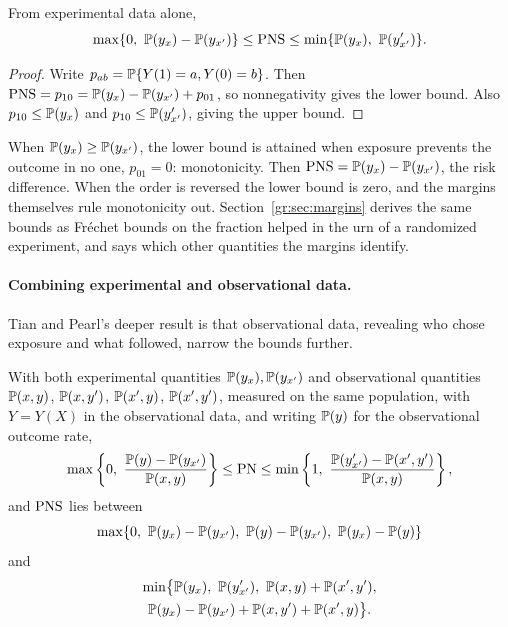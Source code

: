 \begin{theorem}
From experimental data alone,
\[
\max\{0,\ \Prob(y_x) - \Prob(y_{x'})\} \leq \PNS \leq \min\{\Prob(y_x),\ \Prob(y'_{x'})\}.
\]
\end{theorem}

\begin{proof}
Write $p_{ab} = \mathbb{P}\{Y(1) = a, Y(0) = b\}$. Then $\mathrm{PNS} = p_{10} = \mathbb{P}(y_x) - \mathbb{P}(y_{x'}) + p_{01}$, so nonnegativity gives the lower bound. Also $p_{10} \leq \mathbb{P}(y_x)$ and $p_{10} \leq \mathbb{P}(y'_{x'})$, giving the upper bound.
\end{proof}

When $\mathbb{P}(y_x) \geq \mathbb{P}(y_{x'})$, the lower bound is attained when exposure prevents the outcome in no one, $p_{01} = 0$: monotonicity. Then $\mathrm{PNS} = \mathbb{P}(y_x) - \mathbb{P}(y_{x'})$, the risk difference. When the order is reversed the lower bound is zero, and the margins themselves rule monotonicity out. Section~\ref{gr:sec:margins} derives the same bounds as Fr\'echet bounds on the fraction helped in the urn of a randomized experiment, and says which other quantities the margins identify.

\paragraph{Combining experimental and observational data.} Tian and Pearl's deeper result is that observational data, revealing who chose exposure and what followed, narrow the bounds further.

\begin{theorem}
With both experimental quantities $\mathbb{P}(y_x), \mathbb{P}(y_{x'})$ and observational quantities $\mathbb{P}(x, y)$, $\mathbb{P}(x, y')$, $\mathbb{P}(x', y)$, $\mathbb{P}(x', y')$, measured on the same population, with $Y = Y(X)$ in the observational data, and writing $\mathbb{P}(y)$ for the observational outcome rate,
\[
\max\left\{0,\ \frac{\Prob(y) - \Prob(y_{x'})}{\Prob(x, y)}\right\} \leq \PN \leq \min\left\{1,\ \frac{\Prob(y'_{x'}) - \Prob(x', y')}{\Prob(x, y)}\right\},
\]
and $\mathrm{PNS}$ lies between
\[
\max\{0,\ \mathbb{P}(y_x) - \mathbb{P}(y_{x'}),\ \mathbb{P}(y) - \mathbb{P}(y_{x'}),\ \mathbb{P}(y_x) - \mathbb{P}(y)\}
\]
and
\begin{multline*}
\min\bigl\{\mathbb{P}(y_x),\ \mathbb{P}(y'_{x'}),\ \mathbb{P}(x, y) + \mathbb{P}(x', y'),\\
\mathbb{P}(y_x) - \mathbb{P}(y_{x'}) + \mathbb{P}(x, y') + \mathbb{P}(x', y)\bigr\}.
\end{multline*}
\end{theorem}

